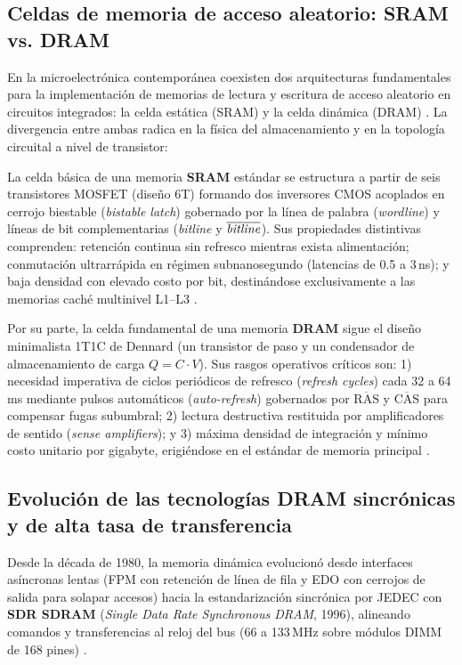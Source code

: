 \documentclass[12pt]{article}
\begin{document}
\subsection{Celdas de memoria de acceso aleatorio: SRAM vs. DRAM}
\label{sec:celdasSramDram}

En la microelectrónica contemporánea coexisten dos arquitecturas fundamentales para la implementación de memorias de lectura y escritura de acceso aleatorio en circuitos integrados: la celda estática (SRAM) y la celda dinámica (DRAM) \parencite[\S 2.3, p.\ 65]{deitel2004operating}. La divergencia entre ambas radica en la física del almacenamiento y en la topología circuital a nivel de transistor:

La celda básica de una memoria \textbf{SRAM} estándar se estructura a partir de seis transistores MOSFET (diseño 6T) formando dos inversores CMOS acoplados en cerrojo biestable (\textit{bistable latch}) gobernado por la línea de palabra (\textit{wordline}) y líneas de bit complementarias (\textit{bitline} y $\overline{\text{\textit{bitline}}}$). Sus propiedades distintivas comprenden: retención continua sin refresco mientras exista alimentación; conmutación ultrarrápida en régimen subnanosegundo (latencias de 0.5 a 3\,ns); y baja densidad con elevado costo por bit, destinándose exclusivamente a las memorias caché multinivel L1--L3 \parencite[\S 2.3, p.\ 65]{deitel2004operating}.

Por su parte, la celda fundamental de una memoria \textbf{DRAM} sigue el diseño minimalista 1T1C de Dennard (un transistor de paso y un condensador de almacenamiento de carga $Q = C \cdot V$). Sus rasgos operativos críticos son: 1) necesidad imperativa de ciclos periódicos de refresco (\textit{refresh cycles}) cada 32 a 64\,ms mediante pulsos automáticos (\textit{auto-refresh}) gobernados por $\overline{\text{RAS}}$ y $\overline{\text{CAS}}$ para compensar fugas subumbral; 2) lectura destructiva restituida por amplificadores de sentido (\textit{sense amplifiers}); y 3) máxima densidad de integración y mínimo costo unitario por gigabyte, erigiéndose en el estándar de memoria principal \parencite[\S 2.3, p.\ 65]{deitel2004operating}.

\subsection{Evolución de las tecnologías DRAM sincrónicas y de alta tasa de transferencia}
\label{sec:evolucionDramSincronica}

Desde la década de 1980, la memoria dinámica evolucionó desde interfaces asíncronas lentas (FPM con retención de línea de fila y EDO con cerrojos de salida para solapar accesos) hacia la estandarización sincrónica por JEDEC con \textbf{SDR SDRAM} (\textit{Single Data Rate Synchronous DRAM}, 1996), alineando comandos y transferencias al reloj del bus (66 a 133\,MHz sobre módulos DIMM de 168 pines) \parencite[\S 2.3, p.\ 65]{deitel2004operating}.
\end{document}
